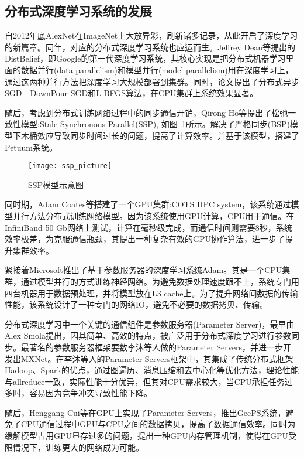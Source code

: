 \subsection{分布式深度学习系统的发展}
自2012年底AlexNet在ImageNet上大放异彩，刷新诸多记录，从此开启了深度学习的新篇章。同年，对应的分布式深度学习系统也应运而生。Jeffrey Dean等提出的DistBelief，即Google的第一代深度学习系统，其核心实现是把分布式机器学习里面的数据并行(data parallelism)和模型并行(model parallelism)用在深度学习上，通过这两种并行方法把深度学习大规模部署到集群。同时，论文提出了分布式异步SGD—DownPour SGD和L-BFGS算法，在CPU集群上系统效果显著。

随后，考虑到分布式训练网络过程中的同步通信开销，Qirong Ho等提出了松弛一致性模型:Stale Synchronous Parallel(SSP), 如图~\ref{fig:ssp_picture}所示。解决了严格同步(BSP)模型下木桶效应导致同步时间过长的问题，提高了计算效率。并基于该模型，搭建了Petuum系统。

\begin{figure}[htp]
\centering
\texttt{[image: ssp\_picture]}
\caption{SSP模型示意图}
\label{fig:ssp_picture}
\end{figure}
同时期，Adam Coates等搭建了一个GPU集群:COTS HPC system，该系统通过模型并行方法分布式训练网络模型。因为该系统使用GPU计算，CPU用于通信。在InfiniBand 50 Gb网络上测试，计算在毫秒级完成，而通信时间则需要8秒，系统效率极差，为克服通信瓶颈，其提出一种复杂有效的GPU协作算法，进一步了提升集群效率。

紧接着Microsoft推出了基于参数服务器的深度学习系统Adam。其是一个CPU集群，通过模型并行的方式训练神经网络。为避免数据处理速度跟不上，系统专门用四台机器用于数据预处理，并将模型放在L3 cache上。为了提升网络间数据的传输性能，该系统设计了一种专门的网络IO，避免不必要的数据拷贝、传输。

分布式深度学习中一个关键的通信组件是参数服务器(Parameter Server)，最早由Alex Smola提出，因其简单、高效的特点，被广泛用于分布式深度学习进行参数同步。最著名的参数服务器框架要数李沐等人做的Parameter Servers，并进一步开发出MXNet。在李沐等人的Parameter Servers框架中，其集成了传统分布式框架Hadoop、Spark的优点，通过图遍历、消息压缩和去中心化等优化方法，理论性能与allreduce一致，实际性能十分优异，但其对CPU需求较大，当CPU承担任务过多时，容易因为竞争冲突导致性能下降。

随后，Henggang Cui等在GPU上实现了Parameter Servers，推出GeePS系统，避免了CPU通信过程中GPU与CPU之间的数据拷贝，提高了数据通信效率。同时为缓解模型占用GPU显存过多的问题，提出一种GPU内存管理机制，使得在GPU受限情况下，训练更大的网络成为可能。
